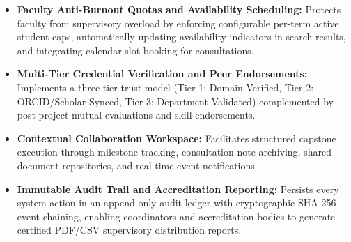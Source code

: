 \begin{itemize}[label=\textbf{\tiny\ensuremath{\blacksquare}}]
    \item \textbf{Faculty Anti-Burnout Quotas and Availability Scheduling:} Protects faculty from supervisory overload by enforcing configurable per-term active student caps, automatically updating availability indicators in search results, and integrating calendar slot booking for consultations.
    
    \item \textbf{Multi-Tier Credential Verification and Peer Endorsements:} Implements a three-tier trust model (Tier-1: Domain Verified, Tier-2: ORCID/Scholar Synced, Tier-3: Department Validated) complemented by post-project mutual evaluations and skill endorsements.
    
    \item \textbf{Contextual Collaboration Workspace:} Facilitates structured capstone execution through milestone tracking, consultation note archiving, shared document repositories, and real-time event notifications.
    
    \item \textbf{Immutable Audit Trail and Accreditation Reporting:} Persists every system action in an append-only audit ledger with cryptographic SHA-256 event chaining, enabling coordinators and accreditation bodies to generate certified PDF/CSV supervisory distribution reports.
\end{itemize}
